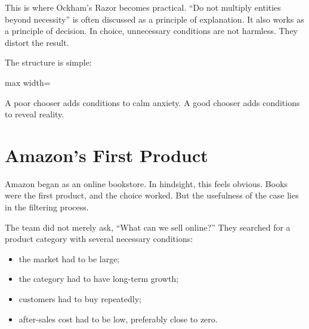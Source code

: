 This is where Ockham's Razor becomes practical. ``Do not multiply entities beyond necessity'' is often discussed as a principle of explanation. It also works as a principle of decision. In choice, unnecessary conditions are not harmless. They distort the result.

The structure is simple:

\begin{center}
\begin{adjustbox}{max width=\linewidth}
\end{adjustbox}
\end{center}

A poor chooser adds conditions to calm anxiety. A good chooser adds conditions to reveal reality.

\section*{Amazon's First Product}

Amazon began as an online bookstore. In hindsight, this feels obvious. Books were the first product, and the choice worked. But the usefulness of the case lies in the filtering process.

The team did not merely ask, ``What can we sell online?'' They searched for a product category with several necessary conditions:

\begin{itemize}
\item the market had to be large;
\item the category had to have long-term growth;
\item customers had to buy repeatedly;
\item after-sales cost had to be low, preferably close to zero.
\end{itemize}

